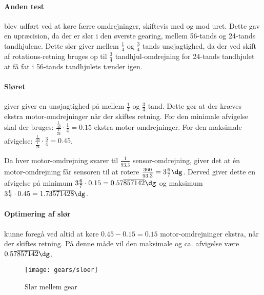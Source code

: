 \paragraph{Anden test} blev udført ved at køre færre omdrejninger, skiftevis med og mod uret.
Dette gav en upræcision, da der er slør i den øverste gearing, mellem 56-tands og 24-tands tandhjulene.
Dette slør giver mellem $\frac{1}{4}$ og $\frac{3}{4}$ tands unøjagtighed, da der ved skift af rotations-retning bruges op til $\frac{3}{4}$ tandhjul-omdrejning for 24-tands tandhjulet at få fat i 56-tands tandhjulets tænder igen.

\paragraph{Sløret} giver giver en unøjagtighed på mellem $\frac{1}{4}$ og $\frac{3}{4}$ tand.
Dette gør at der kræves ekstra motor-omdrejninger når der skiftes retning.
For den minimale afvigelse skal der bruges: $ \frac{\frac{1}{40}}{\frac{1}{24}}\cdot\frac{1}{4} = 0.15$ ekstra motor-omdrejninger.
For den maksimale afvigelse: $ \frac{\frac{1}{40}}{\frac{1}{24}}\cdot\frac{3}{4} = 0.45$.

Da hver motor-omdrejning svarer til $\frac{1}{93.\overline{3}}$ sensor-omdrejning, giver det at én motor-omdrejning får sensoren til at rotere $\frac{360}{93.\overline{3}} = 3\frac{6}{7}\dg$.
Derved giver dette en afvigelse på minimum $3\frac{6}{7}\cdot0.15 = 0.57\overline{857142}\dg$ og maksimum $3\frac{6}{7}\cdot0.45 = 1.73\overline{571428}\dg$.

\paragraph{Optimering af slør} kunne foregå ved altid at køre $0.45 - 0.15 = 0.15$ motor-omdrejninger ekstra, når der skiftes retning.
På denne måde vil den maksimale og ca. afvigelse være $0.57\overline{857142}\dg$.

\begin{figure}[h]
\centering
\texttt{[image: gears/sloer]}
\caption{Slør mellem gear}
\label{gearing:sloer}
\end{figure}